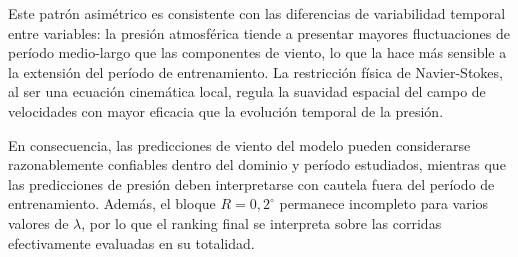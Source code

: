 Este patrón asimétrico es consistente con las diferencias de variabilidad temporal entre
variables: la presión atmosférica tiende a presentar mayores fluctuaciones de período
medio-largo que las componentes de viento, lo que la hace más sensible a la extensión del
período de entrenamiento. La restricción física de Navier-Stokes, al ser una ecuación
cinemática local, regula la suavidad espacial del campo de velocidades con mayor eficacia
que la evolución temporal de la presión.

En consecuencia, las predicciones de viento del modelo pueden considerarse razonablemente
confiables dentro del dominio y período estudiados, mientras que las predicciones de presión
deben interpretarse con cautela fuera del período de entrenamiento. Además, el bloque
$R=0{,}2^{\circ}$ permanece incompleto para varios valores de $\lambda$, por lo que el ranking
final se interpreta sobre las corridas efectivamente evaluadas en su totalidad.


